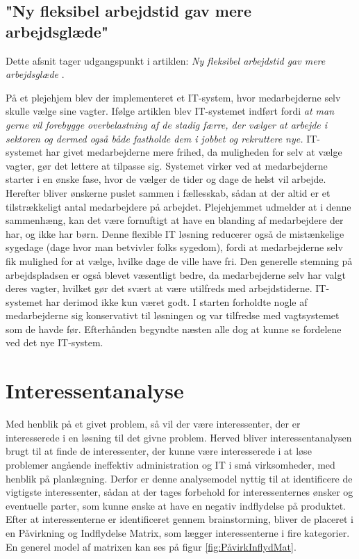 \subsection{"Ny fleksibel arbejdstid gav mere arbejdsglæde"}
\noindent Dette afsnit tager udgangspunkt i artiklen: \textit{Ny fleksibel arbejdstid gav mere arbejdsglæde} \citep{Thomse2014}.

På et plejehjem blev der implementeret et IT-system, hvor medarbejderne selv skulle vælge sine vagter. Ifølge artiklen blev IT-systemet indført fordi \textit{ at man gerne vil forebygge overbelastning af de stadig færre, der vælger at arbejde i sektoren og dermed også både fastholde dem i jobbet og rekruttere nye.} IT-systemet har givet medarbejderne mere frihed, da muligheden for selv at vælge vagter, gør det lettere at tilpasse sig. Systemet virker ved at medarbejderne starter i en ønske fase, hvor de vælger de tider og dage de helst vil arbejde. Herefter bliver ønskerne puslet sammen i fællesskab, sådan at der altid er et tilstrækkeligt antal medarbejdere på arbejdet. Plejehjemmet udmelder at i denne sammenhæng, kan det være fornuftigt at have en blanding af medarbejdere der har, og ikke har børn. Denne flexible IT løsning reducerer også de mistænkelige sygedage (dage hvor man betvivler folks sygedom), fordi at medarbejderne selv fik mulighed for at vælge, hvilke dage de ville have fri. Den generelle stemning på arbejdspladsen er også blevet væsentligt bedre, da medarbejderne selv har valgt deres vagter, hvilket gør det svært at være utilfreds med arbejdstiderne. IT-systemet har derimod ikke kun været godt. I starten forholdte nogle af medarbejderne sig konservativt til løsningen og var tilfredse med vagtsystemet som de havde før. Efterhånden begyndte næsten alle dog at kunne se fordelene ved det nye IT-system. 

\section{Interessentanalyse}
Med henblik på et givet problem, så vil der være interessenter, der er interesserede i en løsning til det givne problem. Herved bliver interessentanalysen brugt til at finde de interessenter, der kunne være interesserede i at løse problemer angående ineffektiv administration og IT i små virksomheder, med henblik på planlægning.
Derfor er denne analysemodel nyttig til at identificere de vigtigste interessenter, sådan at der tages forbehold for interessenternes ønsker og eventuelle parter, som kunne ønske at have en negativ indflydelse på produktet. Efter at interessenterne er identificeret gennem brainstorming, bliver de placeret i en Påvirkning og Indflydelse Matrix, som lægger interessenterne i fire kategorier. En generel model af matrixen kan ses på figur \ref{fig:PåvirkInflydMat}.


